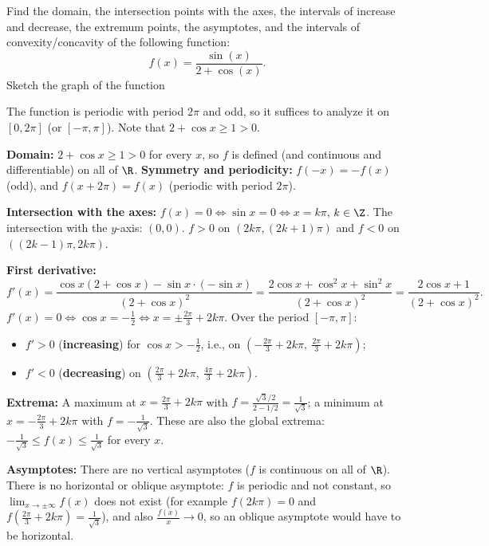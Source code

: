 
\begin{question}
Find the domain, the intersection points with the axes, the intervals of increase and decrease, the extremum points, the asymptotes, and the intervals of convexity/concavity of the following function:
\[ f(x)=\frac{\sin(x)}{2+\cos(x)}. \]
Sketch the graph of the function
\end{question}

\begin{hint}
The function is periodic with period $2\pi$ and odd, so it suffices to analyze it on $[0,2\pi]$ (or $[-\pi,\pi]$). Note that $2+\cos x\ge1>0$.
\end{hint}

\begin{solution}
\textbf{Domain:} $2+\cos x\ge1>0$ for every $x$, so $f$ is defined (and continuous and differentiable) on all of $\R$.
\textbf{Symmetry and periodicity:} $f(-x)=-f(x)$ (odd), and $f(x+2\pi)=f(x)$ (periodic with period $2\pi$).

\textbf{Intersection with the axes:} $f(x)=0\iff\sin x=0\iff x=k\pi$, $k\in\Z$. The intersection with the $y$-axis: $(0,0)$. $f>0$ on $(2k\pi,(2k+1)\pi)$ and $f<0$ on $((2k-1)\pi,2k\pi)$.

\textbf{First derivative:}
\[ f'(x)=\frac{\cos x(2+\cos x)-\sin x\cdot(-\sin x)}{(2+\cos x)^2}=\frac{2\cos x+\cos^2x+\sin^2x}{(2+\cos x)^2}=\frac{2\cos x+1}{(2+\cos x)^2}. \]
$f'(x)=0\iff\cos x=-\frac12\iff x=\pm\frac{2\pi}{3}+2k\pi$. Over the period $[-\pi,\pi]$:
\begin{itemize}
  \item $f'>0$ (\textbf{increasing}) for $\cos x>-\frac12$, i.e., on $\left(-\frac{2\pi}3+2k\pi,\ \frac{2\pi}3+2k\pi\right)$;
  \item $f'<0$ (\textbf{decreasing}) on $\left(\frac{2\pi}3+2k\pi,\ \frac{4\pi}3+2k\pi\right)$.
\end{itemize}
\textbf{Extrema:} A maximum at $x=\frac{2\pi}3+2k\pi$ with $f=\frac{\sqrt3/2}{2-1/2}=\frac{1}{\sqrt3}$; a minimum at $x=-\frac{2\pi}3+2k\pi$ with $f=-\frac1{\sqrt3}$. These are also the global extrema: $-\frac1{\sqrt3}\le f(x)\le\frac1{\sqrt3}$ for every $x$.

\textbf{Asymptotes:} There are no vertical asymptotes ($f$ is continuous on all of $\R$). There is no horizontal or oblique asymptote: $f$ is periodic and not constant, so $\lim_{x\to\pm\infty}f(x)$ does not exist (for example $f(2k\pi)=0$ and $f(\frac{2\pi}3+2k\pi)=\frac1{\sqrt3}$), and also $\frac{f(x)}{x}\to0$, so an oblique asymptote would have to be horizontal.


\end{solution}
